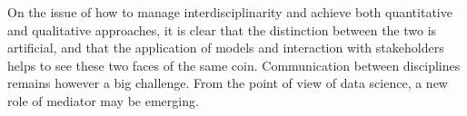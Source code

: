 \documentclass[10pt]{article}
\begin{document}
On the issue of how to manage interdisciplinarity and achieve both quantitative and qualitative approaches, it is clear that the distinction between the two is artificial, and that the application of models and interaction with stakeholders helps to see these two faces of the same coin. Communication between disciplines remains however a big challenge. From the point of view of data science, a new role of mediator may be emerging.
\end{document}
